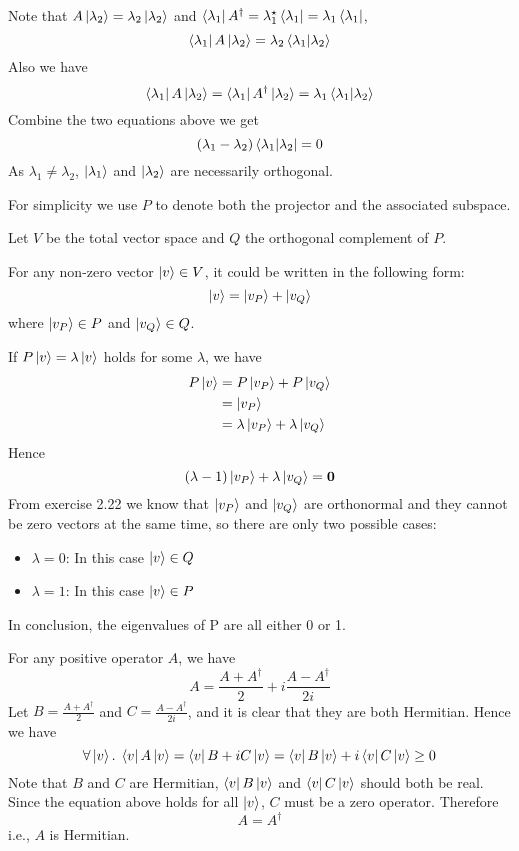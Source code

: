 \documentclass{homeworg}
\begin{document}
Note that $A\ket{\lambda_2}=\lambda_2\ket{\lambda_2}$ and $\bra{\lambda_1}A^\dagger=\lambda_1^\star\bra{\lambda_1}=\lambda_1\bra{\lambda_1}$,
\[\bra{\lambda_1}A\ket{\lambda_2}=\lambda_2\braket{\lambda_1|\lambda_2}\]
Also we have 
\[\bra{\lambda_1}A\ket{\lambda_2}=\bra{\lambda_1}A^\dagger\ket{\lambda_2}=\lambda_1\braket{\lambda_1|\lambda_2}\]
Combine the two equations above we get
\[(\lambda_1-\lambda_2)\bra{\lambda_1|\lambda_2}=0\]
As $\lambda_1 \neq \lambda_2$, $\ket{\lambda_1}$ and $\ket{\lambda_2}$ are necessarily orthogonal.

\exercise*
For simplicity we use $P$ to denote both the projector and the associated subspace.

Let $V$ be the total vector space and $Q$ the orthogonal complement of $P$.

For any non-zero vector $\ket{v}\in V$, it could be written in the following form:
\[\ket{v}=\ket{v_P}+\ket{v_Q}\]
where $\ket{v_P}\in P$ and $\ket{v_Q}\in Q$.

If $P\ket{v}=\lambda \ket{v}$ holds for some $\lambda$, we have
\begin{align}
    P\ket{v}&=P\ket{v_P}+P\ket{v_Q}\nonumber\\
    &=\ket{v_P}\nonumber\\
    &=\lambda\ket{v_P} + \lambda\ket{v_Q}\nonumber
\end{align}
Hence
\[(\lambda-1)\ket{v_P}+\lambda\ket{v_Q}=\bm{0}\]
From exercise 2.22 we know that $\ket{v_P}$ and $\ket{v_Q}$ are orthonormal and they cannot be zero vectors at the same time, so there are only two possible cases:
\begin{itemize}
    \item $\lambda =0$: In this case $\ket{v}\in Q$
    \item $\lambda =1$: In this case $\ket{v}\in P$
\end{itemize}
In conclusion, the eigenvalues of P are all either 0 or 1.

\exercise*
For any positive operator $A$, we have
\[A=\frac{A+A^\dagger}{2}+i\frac{A-A^\dagger}{2i}\]
Let $B=\frac{A+A^\dagger}{2}$ and $C=\frac{A-A^\dagger}{2i}$, and it is clear that they are both Hermitian. Hence we have
\[\forall\ket{v}.\;\bra{v}A\ket{v}=\bra{v}B+iC\ket{v}=\bra{v}B\ket{v}+i\bra{v}C\ket{v}\geq 0\]
Note that $B$ and $C$ are Hermitian, $\bra{v}B\ket{v}$ and $\bra{v}C\ket{v}$ should both be real. Since the equation above holds for all $\ket{v}$, $C$ must be a zero operator. Therefore
\[A=A^\dagger\]
i.e., $A$ is Hermitian.
\end{document}
